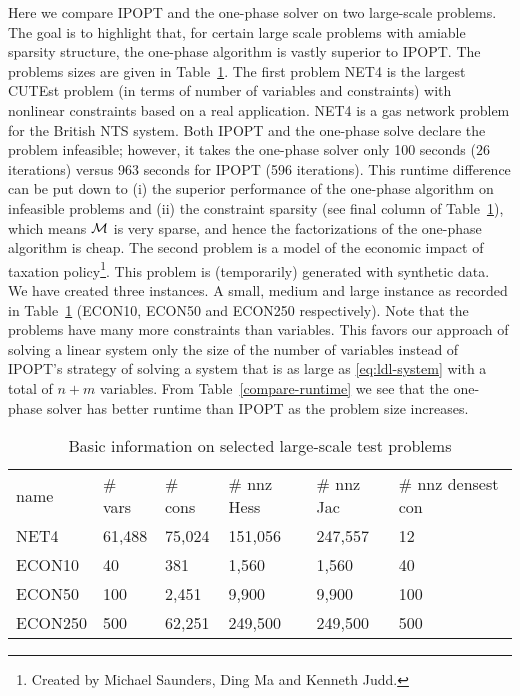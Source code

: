 \documentclass{article}
\begin{document}
Here we compare IPOPT and the one-phase solver on two large-scale problems. The goal is to highlight that, for certain large scale problems with amiable sparsity structure, the one-phase algorithm is vastly superior to IPOPT. The problems sizes are given in Table~\ref{large-scale:basic-info}. The first problem NET4 is the largest CUTEst problem (in terms of number of variables and constraints) with nonlinear constraints based on a real application. NET4 is a gas network problem for the British NTS system. Both IPOPT and the one-phase solve declare the problem infeasible; however, it takes the one-phase solver only 100 seconds ($26$ iterations) versus 963 seconds for IPOPT (596 iterations). This runtime difference can be put down to (i) the superior performance of the one-phase algorithm on infeasible problems and (ii) the constraint sparsity (see final column of Table~\ref{large-scale:basic-info}), which means $\mathcal{M}$ is very sparse, and hence the factorizations of the one-phase algorithm is cheap. The second problem is a model of the economic impact of taxation policy\footnote{Created by Michael Saunders, Ding Ma and Kenneth Judd.}. This problem is (temporarily) generated with synthetic data. We have created three instances. A small, medium and large instance as recorded in Table~\ref{large-scale:basic-info} (ECON10, ECON50 and ECON250 respectively). Note that the problems have many more constraints than variables. This favors our approach of solving a linear system only the size of the number of variables instead of IPOPT's strategy of solving a system that is as large as \eqref{eq:ldl-system} with a total of $n + m$ variables. From Table~\ref{compare-runtime} we see that the one-phase solver has better runtime than IPOPT as the problem size increases.
\begin{table}[H]
\begin{tabular}{l l l l l l}
name &  \# vars & \# cons & \# nnz Hess & \# nnz Jac & \# nnz densest con  \\ 
NET4 & 61,488 & 75,024  & 151,056 & 247,557 & 12 \\  
ECON10 &  40 & 381 & 1,560 & 1,560 &  40 \\
ECON50 &  100 & 2,451 & 9,900 & 9,900 &  100 \\
ECON250 & 500 & 62,251 & 249,500 & 249,500 & 500 \\
\end{tabular}
\caption{Basic information on selected large-scale test problems}\label{large-scale:basic-info}
\end{table}
\end{document}
